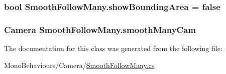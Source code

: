 \subsubsection[{\texorpdfstring{show\+Bounding\+Area}{showBoundingArea}}]{\setlength{\rightskip}{0pt plus 5cm}bool Smooth\+Follow\+Many.\+show\+Bounding\+Area = false}\hypertarget{class_smooth_follow_many_ac356032e0ae29d4a88c4dbdc0ed348e8}{}\label{class_smooth_follow_many_ac356032e0ae29d4a88c4dbdc0ed348e8}
\subsubsection[{\texorpdfstring{smooth\+Many\+Cam}{smoothManyCam}}]{\setlength{\rightskip}{0pt plus 5cm}Camera Smooth\+Follow\+Many.\+smooth\+Many\+Cam}\hypertarget{class_smooth_follow_many_a8114db85716e7325ad596e7232b849d5}{}\label{class_smooth_follow_many_a8114db85716e7325ad596e7232b849d5}


The documentation for this class was generated from the following file\+:\begin{DoxyCompactItemize}
\item 
Mono\+Behaviours/\+Camera/\hyperlink{_smooth_follow_many_8cs}{Smooth\+Follow\+Many.\+cs}\end{DoxyCompactItemize}
